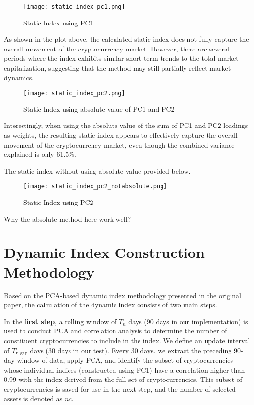 \documentclass[12pt]{article}
\begin{document}
\begin{figure}[H]
    \centering
    \texttt{[image: static\_index\_pc1.png]}
    \caption{Static Index using PC1}
    \label{fig:si1}
\end{figure}

As shown in the plot above, the calculated static index does not fully capture the overall movement of the cryptocurrency market. However, there are several periods where the index exhibits similar short-term trends to the total market capitalization, suggesting that the method may still partially reflect market dynamics.

\begin{figure}[H]
    \centering
    \texttt{[image: static\_index\_pc2.png]}
    \caption{Static Index using absolute value of PC1 and PC2}
    \label{fig:si1}
\end{figure}
Interestingly, when using the absolute value of the sum of PC1 and PC2 loadings as weights, the resulting static index appears to effectively capture the overall movement of the cryptocurrency market, even though the combined variance explained is only 61.5\%.

The static index without using absolute value provided below.
\begin{figure}[H]
    \centering
    \texttt{[image: static\_index\_pc2\_notabsolute.png]}
    \caption{Static Index using PC2}
    \label{fig:si1}
\end{figure}

 Why the absolute method here work well?
\

\section{Dynamic Index Construction Methodology}

Based on the PCA-based dynamic index methodology presented in the original paper, the calculation of the dynamic index consists of two main steps.

In the \textbf{first step}, a rolling window of \( T_n \) days (90 days in our implementation) is used to conduct PCA and correlation analysis to determine the number of constituent cryptocurrencies to include in the index. We define an update interval of \( T_{\text{n\_gap}} \) days (30 days in our test). Every 30 days, we extract the preceding 90-day window of data, apply PCA, and identify the subset of cryptocurrencies whose individual indices (constructed using PC1) have a correlation higher than 0.99 with the index derived from the full set of cryptocurrencies. This subset of cryptocurrencies is saved for use in the next step, and the number of selected assets is denoted as \( nc \).
\end{document}
